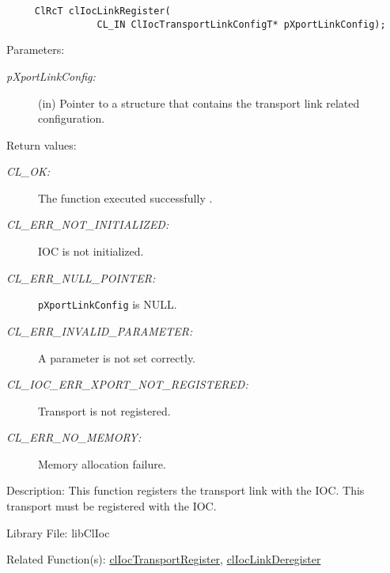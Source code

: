 \begin{flushleft}
\begin{Desc}
\footnotesize\begin{verbatim}     ClRcT clIocLinkRegister(
                CL_IN ClIocTransportLinkConfigT* pXportLinkConfig);
\end{verbatim}
\normalsize
\end{Desc}
\begin{Desc}
\item[Parameters:]
\begin{description}
\item[{\em p\-Xport\-Link\-Config:}](in) Pointer to a structure that contains the transport link related configuration.\end{description}
\end{Desc}
\begin{Desc}
\item[Return values:]
\begin{description}
\item[{\em CL\_\-OK:}]The function executed successfully . \item[{\em CL\_\-ERR\_\-NOT\_\-INITIALIZED:}] IOC is not initialized. 
\item[{\em CL\_\-ERR\_\-NULL\_\-POINTER:}]{\tt{pXportLinkConfig}} is NULL. \item[{\em CL\_\-ERR\_\-INVALID\_\-PARAMETER:}]A parameter is not set correctly.
\item[{\em CL\_\-IOC\_\-ERR\_\-XPORT\_\-NOT\_\-REGISTERED:}]Transport is not registered. 
\item[{\em CL\_\-ERR\_\-NO\_\-MEMORY:}]Memory allocation failure.\end{description}
\end{Desc}
\begin{Desc}
\item[Description:]This function registers the transport link with the IOC. This transport must be registered with the IOC. \end{Desc}
\begin{Desc}
\item[Library File:]libClIoc\end{Desc}
\begin{Desc}
\item[Related Function(s):]\hyperlink{pageioc118}{cl\-Ioc\-Transport\-Register}, \hyperlink{pageioc119}{cl\-Ioc\-Link\-Deregister} \end{Desc}
\newpage



\end{flushleft}
